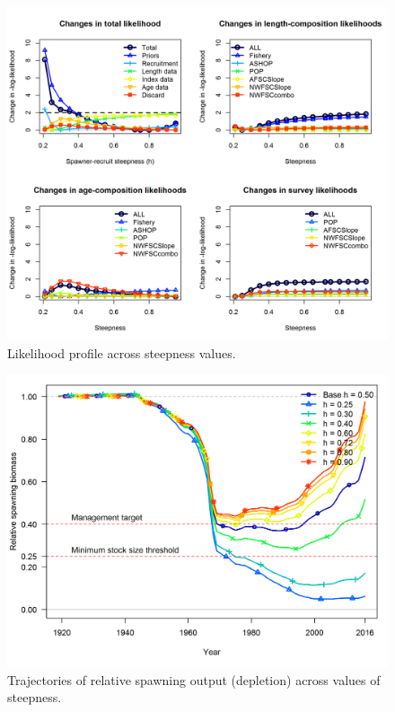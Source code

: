 \documentclass[12pt,]{article}
\begin{document}
\begin{figure}
\centering
\includegraphics{Figures/piner_panel_h.png}
\caption{Likelihood profile across steepness values.
\label{fig:piner_h}}
\end{figure}

\FloatBarrier

\begin{figure}
\centering
\includegraphics{Figures/h_trajectories.png}
\caption{Trajectories of relative spawning output (depletion) across
values of steepness. \label{fig:h_trajectory}}
\end{figure}
\end{document}
